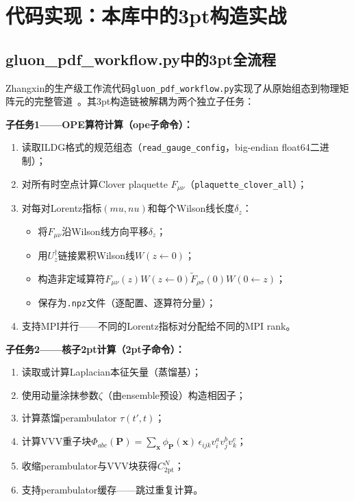 \documentclass[12pt,a4paper]{ctexart}
\theoremstyle{definition}
\begin{document}
\section{代码实现：本库中的3pt构造实战}

\subsection{gluon\_pdf\_workflow.py中的3pt全流程}

Zhangxin的生产级工作流代码\texttt{gluon\_pdf\_workflow.py}实现了从原始组态到物理矩阵元的完整管道~\cite{gluonWorkflow2026}。其3pt构造链被解耦为两个独立子任务：

\textbf{子任务1——OPE算符计算（ope子命令）：}
\begin{enumerate}[leftmargin=*]
    \item 读取ILDG格式的规范组态（\texttt{read\_gauge\_config}，big-endian float64二进制）；
    \item 对所有时空点计算Clover plaquette $F_{\mu\nu}$（\texttt{plaquette\_clover\_all}）；
    \item 对每对Lorentz指标$(mu, nu)$和每个Wilson线长度$\delta_z$：
    \begin{itemize}
        \item 将$F_{\mu\nu}$沿Wilson线方向平移$\delta_z$；
        \item 用$U_z^\dagger$链接累积Wilson线$W(z \leftarrow 0)$；
        \item 构造非定域算符$F_{\mu\nu}(z) W(z \leftarrow 0) \tilde{F}_{\rho\sigma}(0) W(0 \leftarrow z)$；
        \item 保存为\texttt{.npz}文件（逐配置、逐算符分量）；
    \end{itemize}
    \item 支持MPI并行——不同的Lorentz指标对分配给不同的MPI rank。
\end{enumerate}

\textbf{子任务2——核子2pt计算（2pt子命令）：}
\begin{enumerate}[leftmargin=*]
    \item 读取或计算Laplacian本征矢量（蒸馏基）；
    \item 使用动量涂抹参数$\zeta$（由ensemble预设）构造相因子；
    \item 计算蒸馏perambulator $\tau(t', t)$；
    \item 计算VVV重子块$\Phi_{abc}(\mathbf{P}) = \sum_{\mathbf{x}} \phi_{\mathbf{P}}(\mathbf{x})\,\epsilon_{ijk} v_i^a v_j^b v_k^c$；
    \item 收缩perambulator与VVV块获得$C_{2\text{pt}}^N$；
    \item 支持perambulator缓存——跳过重复计算。
\end{enumerate}
\end{document}
